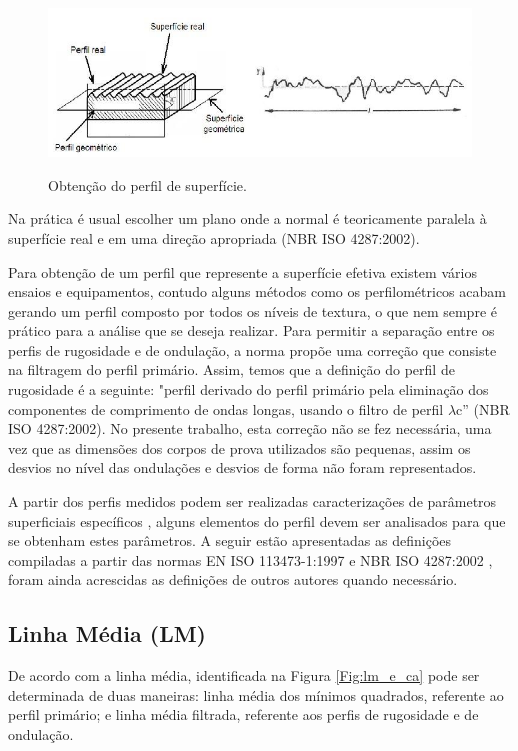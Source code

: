 \begin{figure}[!ht]
\centering
\caption{Obtenção do perfil de superfície.}
{\includegraphics[scale=0.84]{figures/perfil_de_superficie.jpg}}\\
 \label{Fig:perfil_de_superficie}
\end{figure}

Na prática é usual escolher um plano onde a normal é teoricamente paralela à superfície real e em uma direção apropriada (NBR ISO 4287:2002\nocite{iso4287}).

Para obtenção de um perfil que represente a superfície efetiva existem vários ensaios e equipamentos, contudo alguns métodos como os perfilométricos acabam gerando um perfil composto por todos os níveis de textura, o que nem sempre é prático para a análise que se deseja realizar. Para permitir a separação entre os perfis de rugosidade e de ondulação, a norma propõe uma correção que consiste na filtragem do perfil primário. Assim, temos que a definição do perfil de rugosidade é a seguinte: "perfil derivado do perfil primário pela eliminação dos componentes de comprimento de ondas longas, usando o filtro de perfil $\lambda$c” (NBR ISO 4287:2002). No presente trabalho, esta correção não se fez necessária, uma vez que as dimensões dos corpos de prova utilizados são pequenas, assim os desvios no nível das ondulações e desvios de forma não foram representados.

A partir dos perfis medidos podem ser realizadas caracterizações de parâmetros superficiais específicos \cite{machado}, alguns elementos do perfil devem ser analisados para que se obtenham estes parâmetros. A seguir estão apresentadas as definições compiladas a partir das normas EN ISO 113473-1:1997 \nocite{iso113473} e NBR ISO 4287:2002 \nocite{iso4287}, foram ainda acrescidas as definições de outros autores quando necessário.

\subsection{Linha Média (LM)} 
De acordo com  a linha média, identificada na Figura \ref{Fig:lm_e_ca} pode ser determinada de duas maneiras: linha média dos mínimos quadrados, referente ao perfil primário; e linha média filtrada, referente aos perfis de rugosidade e de ondulação.

